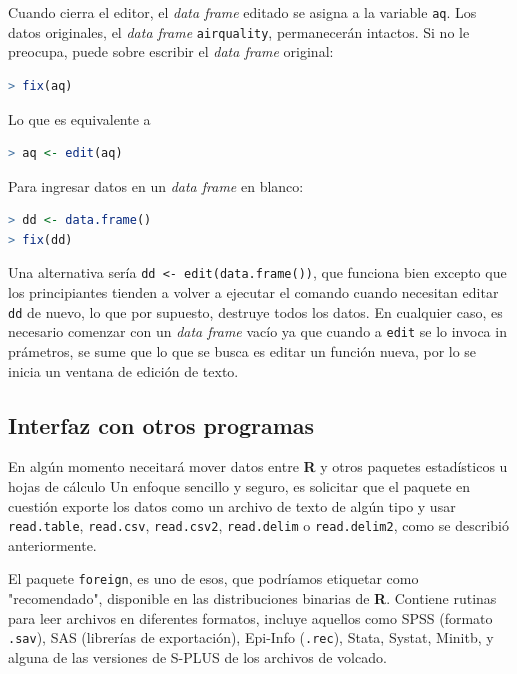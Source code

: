 Cuando cierra el editor, el \textit{data frame} editado se asigna a la variable
\texttt{aq}. Los datos originales, el \textit{data frame} \texttt{airquality},
permanecerán intactos. Si no le preocupa, puede sobre escribir el \textit{data
frame} original:

\begin{lstlisting}[language=R]
> fix(aq)
\end{lstlisting}

Lo que es equivalente a

\begin{lstlisting}[language=R]
> aq <- edit(aq)
\end{lstlisting}

Para ingresar datos en un \textit{data frame} en blanco:

\begin{lstlisting}[language=R]
> dd <- data.frame()
> fix(dd)
\end{lstlisting}

Una alternativa sería \texttt{dd <- edit(data.frame())}, que funciona bien
excepto que los principiantes tienden a volver a ejecutar el comando cuando
necesitan editar \texttt{dd} de nuevo, lo que por supuesto, destruye todos los
datos. En cualquier caso, es necesario comenzar con un \textit{data frame} vacío
ya que cuando a \texttt{edit} se lo invoca in prámetros, se sume que lo que se
busca es editar un función nueva, por lo se inicia un ventana de edición de
texto.

\subsection{Interfaz con otros programas}

En algún momento neceitará mover datos entre \textbf{R} y otros paquetes
estadísticos u hojas de cálculo Un enfoque sencillo y seguro, es solicitar que
el paquete en cuestión exporte los datos como un archivo de texto de algún tipo
y usar \texttt{read.table}, \texttt{read.csv}, \texttt{read.csv2},
\texttt{read.delim} o \texttt{read.delim2}, como se describió anteriormente.

El paquete \texttt{foreign}, es uno de esos, que podríamos etiquetar como
"recomendado", disponible en las distribuciones binarias de \textbf{R}. Contiene
rutinas para leer archivos en diferentes formatos, incluye aquellos como SPSS
(formato \texttt{.sav}), SAS (librerías de exportación), Epi-Info
(\texttt{.rec}), Stata, Systat, Minitb, y alguna de las versiones de S-PLUS de
los archivos de volcado.

